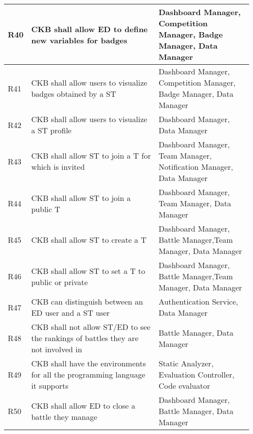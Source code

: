 \begin{center}
\begin{longtable}{|p{0.05\linewidth}|p{0.55\linewidth}|p{0.4\linewidth}|}
        \hline
        R40 & CKB shall allow ED to define new variables for badges & Dashboard Manager, Competition Manager, Badge Manager, Data Manager\\
        \hline
        R41 & CKB shall allow users to visualize badges obtained by a ST & Dashboard Manager, Competition Manager, Badge Manager, Data Manager \\
        \hline
        R42 & CKB shall allow users to visualize a ST profile & Dashboard Manager,  Data Manager\\
        \hline
        R43 & CKB shall allow ST to join a T for which is invited & Dashboard Manager, Team Manager, Notification Manager, Data Manager \\
        \hline
        R44 & CKB shall allow ST to join a public T & Dashboard Manager, Team Manager, Data Manager \\
        \hline
        R45 & CKB shall allow ST to create a T & Dashboard Manager, Battle Manager,Team Manager, Data Manager \\
        \hline
        R46 & CKB shall allow ST to set a T to public or private & Dashboard Manager, Battle Manager,Team Manager, Data Manager  \\
        \hline
        R47 & CKB can distinguish between an ED user and a ST user & Authentication Service, Data Manager \\
        \hline
        R48 & CKB shall not allow ST/ED to see the rankings of battles they are not involved in & Battle Manager, Data Manager\\
        \hline
        R49 & CKB shall have the environments for all the programming language it supports & Static Analyzer, Evaluation Controller, Code evaluator\\
        \hline
        R50 & CKB shall allow ED to close a battle they manage & Dashboard Manager, Battle Manager, Data Manager \\
        \hline

  \end{longtable}
\end{center}
